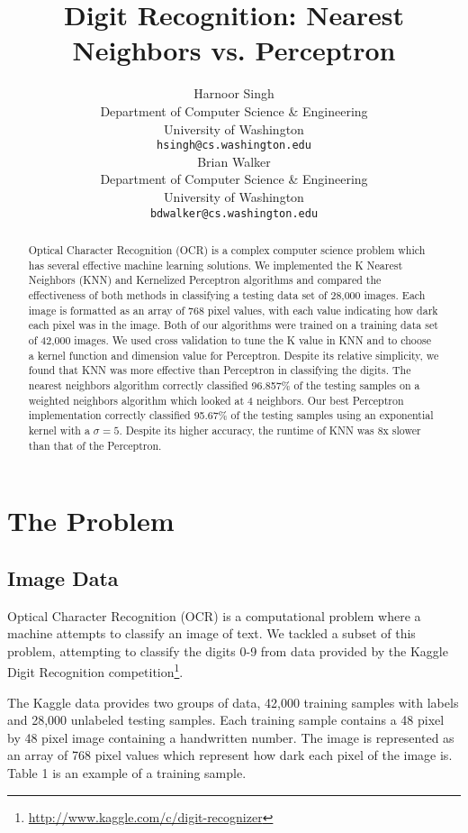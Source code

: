 \documentclass{article} %
\title{Digit Recognition: Nearest Neighbors vs. Perceptron}
\author{
Harnoor Singh \\
Department of Computer Science \& Engineering\\
University of Washington \\
\texttt{hsingh@cs.washington.edu} \\
\And
Brian Walker \\
Department of Computer Science \& Engineering \\
University of Washington \\
\texttt{bdwalker@cs.washington.edu} \\
}
\begin{document}
\maketitle

\begin{abstract}

Optical Character Recognition (OCR) is a complex computer science problem which
has several effective machine learning solutions. We implemented the K Nearest
Neighbors (KNN) and Kernelized Perceptron algorithms and compared the
effectiveness of both methods in classifying a testing data set of 28,000
images. Each image is formatted as an array of 768 pixel values, with each value
indicating how dark each pixel was in the image. Both of our algorithms were
trained on a training data set of 42,000 images. We used cross validation to
tune the K value in KNN and to choose a kernel function and dimension value for
Perceptron. Despite its relative simplicity, we found that KNN was more
effective than Perceptron in classifying the digits. The nearest neighbors
algorithm correctly classified 96.857\% of the testing samples on a weighted
neighbors algorithm which looked at 4 neighbors. Our best Perceptron
implementation correctly classified 95.67\% of the testing samples using an
exponential kernel with a $\sigma = 5$. Despite its higher accuracy, the runtime
of KNN was 8x slower than that of the Perceptron.

\end{abstract}

\section{The Problem}

\subsection{Image Data}
Optical Character Recognition (OCR) is a computational problem where a machine
attempts to classify an image of text. We tackled a subset of this problem,
attempting to classify the digits 0-9 from data provided by the Kaggle Digit
Recognition
competition\footnote{\url{http://www.kaggle.com/c/digit-recognizer}}.

The Kaggle data provides two groups of data, 42,000 training samples with labels
and 28,000 unlabeled testing samples. Each training sample contains a 48 pixel
by 48 pixel image containing a handwritten number. The image is represented as
an array of 768 pixel values which represent how dark each pixel of the image
is. Table 1 is an example of a training sample.
\end{document}
